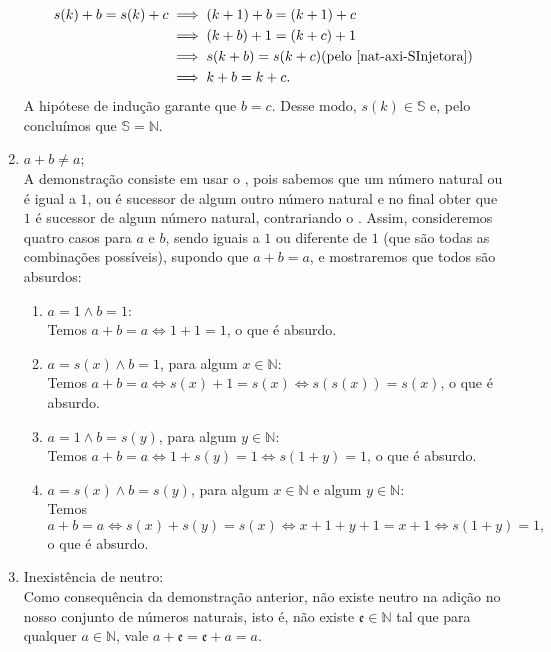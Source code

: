\documentclass[../main.tex]{subfiles}
\begin{document}
\begin{dem}
\begin{enumerate}[label=(\roman*)]
            \begin{align*}
                s(k) + b = s(k) + c &\implies (k+1)+b = (k+1)+c \\
                &\implies (k + b) + 1 = (k + c) + 1 \\
                &\implies s(k+b) = s(k+c) \text{(pelo \Cref{nat-axi-SInjetora})}\\
                &\implies k+b = k+c. 
            \end{align*}
            A hipótese de indução garante que $b = c$. Desse modo, $s(k) \in \mathbb{S}$ e, pelo  concluímos que $\mathbb{S} = \mathbb{N}$. 
        \item $a + b \neq a$;\\
            A demonstração consiste em usar o , pois sabemos que um número natural ou é igual a $1$, ou é sucessor de algum outro número natural e no final obter que $1$ é sucessor de algum número natural, contrariando o . Assim, consideremos quatro casos para $a$ e $b$, sendo iguais a $1$ ou diferente de $1$ (que são todas as combinações possíveis), supondo que $a+b=a$, e mostraremos que todos são absurdos:
            \begin{enumerate}[label=(\arabic*)]
            \item $a=1 \land b=1$: \\
                Temos $a+b=a \iff 1+1=1$, o que é absurdo. 
            \item $a=s(x) \land b=1$, para algum $x \in \mathbb{N}$: \\
                Temos $a+b=a \iff s(x) + 1 = s(x) \iff s(s(x)) = s(x)$, o que é absurdo. 
            \item $a=1 \land b=s(y)$, para algum $y \in \mathbb{N}$: \\
                Temos $a+b=a \iff 1+ s(y) = 1 \iff s(1+y) = 1$, o que é absurdo. 
            \item $a=s(x) \land b=s(y)$, para algum $x \in \mathbb{N}$ e algum $y \in \mathbb{N}$: \\
                Temos 
                \[ a+b=a \iff s(x) + s(y) = s(x) \iff x + 1 + y + 1 = x + 1 \iff s(1 + y) = 1, \]
                o que é absurdo.
            \end{enumerate}
    
        \item Inexistência de neutro: \\
            Como consequência da demonstração anterior, não existe neutro na adição no nosso conjunto de números naturais, isto é, não existe $\mathfrak{e} \in \mathbb{N}$ tal que para qualquer $a \in \mathbb{N}$, vale $a + \mathfrak{e} = \mathfrak{e} + a = a$.
    \end{enumerate}
\end{dem}
 
\end{document}

